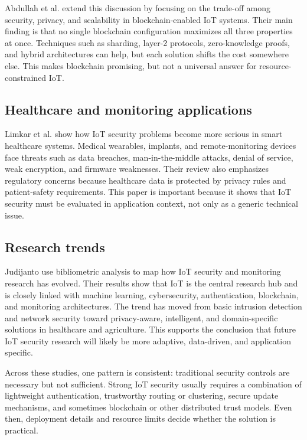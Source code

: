 \documentclass[conference]{IEEEtran}
\begin{document}
Abdullah et al. \cite{tradeoff} extend this discussion by focusing on the trade-off among security, privacy, and scalability in blockchain-enabled IoT systems. Their main finding is that no single blockchain configuration maximizes all three properties at once. Techniques such as sharding, layer-2 protocols, zero-knowledge proofs, and hybrid architectures can help, but each solution shifts the cost somewhere else. This makes blockchain promising, but not a universal answer for resource-constrained IoT.

\subsection{Healthcare and monitoring applications}
Limkar et al. \cite{healthcare} show how IoT security problems become more serious in smart healthcare systems. Medical wearables, implants, and remote-monitoring devices face threats such as data breaches, man-in-the-middle attacks, denial of service, weak encryption, and firmware weaknesses. Their review also emphasizes regulatory concerns because healthcare data is protected by privacy rules and patient-safety requirements. This paper is important because it shows that IoT security must be evaluated in application context, not only as a generic technical issue.

\subsection{Research trends}
Judijanto \cite{bibliometric} use bibliometric analysis to map how IoT security and monitoring research has evolved. Their results show that IoT is the central research hub and is closely linked with machine learning, cybersecurity, authentication, blockchain, and monitoring architectures. The trend has moved from basic intrusion detection and network security toward privacy-aware, intelligent, and domain-specific solutions in healthcare and agriculture. This supports the conclusion that future IoT security research will likely be more adaptive, data-driven, and application specific.

Across these studies, one pattern is consistent: traditional security controls are necessary but not sufficient. Strong IoT security usually requires a combination of lightweight authentication, trustworthy routing or clustering, secure update mechanisms, and sometimes blockchain or other distributed trust models. Even then, deployment details and resource limits decide whether the solution is practical.
\end{document}

